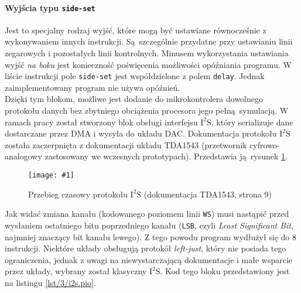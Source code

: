 \documentclass[polish]{aghengthesis}
\newcommand{\imgint}[4]{
	\begin{figure}[{#4}]
		\centering
		\texttt{[image: \#1]}
		\caption{#2}
		\label{#1}
	\end{figure}
}
\newcommand{\imgh}[3]{\imgint{#1}{#2}{#3}{H}}
\newcommand{\isqs}{$\text{I}^{2}\text{S}$}
\newcommand{\sset}{\lstinline|side-set|}
\newcommand{\lstfile}[3]{
	\noindent
	\hspace{0.1\linewidth}
	\begin{minipage}{0.8\linewidth}
		
	\end{minipage}
	\vspace{0.3cm}
}
\begin{document}
			\paragraph{Wyjścia typu \sset{}}
				Jest to specjalny rodzaj wyjść, które mogą być ustawiane równocześnie z wykonywaniem innych instrukcji. Są szczególnie przydatne przy ustawianiu linii zegarowych i pozostałych linii kontrolnych. Minusem wykorzystania ustawiania wyjść \textit{na boku} jest konieczność poświęcenia możliwości opóźniania programu. W liście instrukcji pole \sset{} jest współdzielone z polem \lstinline|delay|. Jednak zaimplementowany program nie używa opóźnień.
			$ $\\
			
			Dzięki tym blokom, możliwe jest dodanie do mikrokontrolera dowolnego protokołu danych bez zbytniego obciążenia procesora jego pełną symulacją. W ramach pracy został stworzony blok obsługi interfejsu \isqs{}, który serializuje dane dostarczane przez DMA i wysyła do układu DAC.
			Dokumentacja protokołu \isqs{} została zaczerpnięta z dokumentacji układu TDA1543 (przetwornik cyfrowo-analogowy zastosowany we wczesnych prototypach). Przedstawia ją rysunek \ref{3/pio_i2s_docs}.
			\imgh{3/pio_i2s_docs}{Przebieg czasowy protokołu \isqs{} (dokumentacja TDA1543\textsuperscript{\cite{tda_pdf}}, strona 9)}{0.9}
			
			Jak widać zmiana kanału (kodowanego poziomem linii \lstinline|WS|)  musi nastąpić przed wysłaniem ostatniego bitu poprzedniego kanału (\lstinline|LSB|, czyli \textit{Least Significant Bit}, najmniej znaczący bit kanału lewego). Z tego powodu program wydłużył się do 8 instrukcji. Niektóre układy obsługują protokół \textit{left-just}, który nie posiada tego ograniczenia, jednak z uwagi na niewystarczającą dokumentacje i małe wsparcie przez układy, wybrany został klasyczny \isqs{}. Kod tego bloku przedstawiony jest na listingu \ref{lst/3/i2s.pio}. 
			
			\lstfile{pio}{Kod programu \isqs{}}{lst/3/i2s.pio}
			
\end{document}
